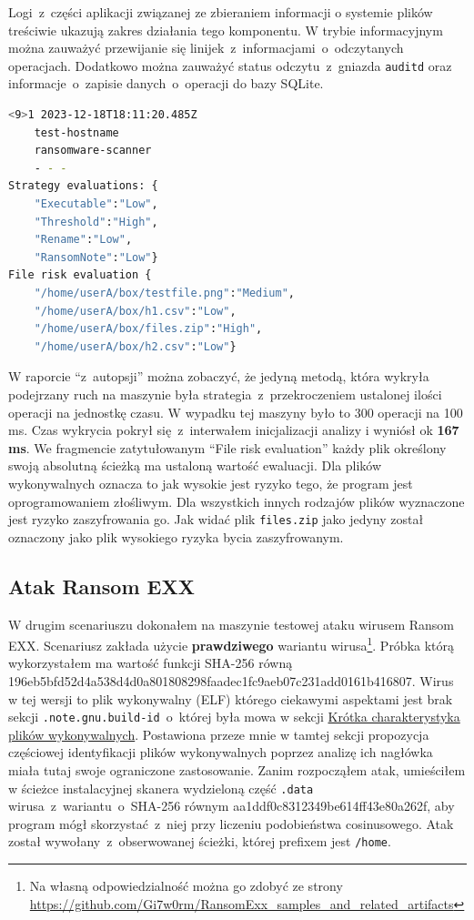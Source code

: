 Logi~z~części aplikacji związanej ze zbieraniem informacji o systemie plików treściwie ukazują zakres działania tego komponentu. W trybie informacyjnym można zauważyć przewijanie się linijek~z~informacjami~o~odczytanych operacjach. Dodatkowo można zauważyć status odczytu~z~gniazda \texttt{auditd} oraz informacje~o~zapisie danych~o~operacji do bazy SQLite.\newpage

\begin{lstlisting}[language=bash,
    backgroundcolor=\color{EEGold!5!white},
    caption={Raport wygenerowany ze skanera, który pozwoliłem sobie delikatnie sformatować aby widać było lepiej jego treść.},
    label={lst:raportau}]
    <9>1 2023-12-18T18:11:20.485Z
    test-hostname 
    ransomware-scanner 
    - - -  
Strategy evaluations: {
    "Executable":"Low",
    "Threshold":"High",
    "Rename":"Low",
    "RansomNote":"Low"}
File risk evaluation {
    "/home/userA/box/testfile.png":"Medium",
    "/home/userA/box/h1.csv":"Low",
    "/home/userA/box/files.zip":"High",
    "/home/userA/box/h2.csv":"Low"}
\end{lstlisting}
W raporcie \enquote{z~autopsji} można zobaczyć, że jedyną metodą, która wykryła podejrzany ruch na maszynie była strategia~z~przekroczeniem ustalonej ilości operacji na jednostkę czasu. W wypadku tej maszyny było to 300 operacji na 100 ms. 
Czas wykrycia pokrył się~z~interwałem inicjalizacji analizy i wyniósł ok \textbf{167 ms}.
\newline
We fragmencie zatytułowanym \foreignquote{english}{File risk evaluation} każdy plik określony swoją absolutną ścieżką ma ustaloną wartość ewaluacji. Dla plików wykonywalnych oznacza to jak wysokie jest ryzyko tego, że program jest oprogramowaniem złośliwym. Dla wszystkich innych rodzajów plików wyznaczone jest ryzyko zaszyfrowania go. Jak widać plik \texttt{files.zip} jako jedyny został oznaczony jako plik wysokiego ryzyka bycia zaszyfrowanym.

\subsection{Atak Ransom EXX}
W drugim scenariuszu dokonałem na maszynie testowej ataku wirusem Ransom EXX. Scenariusz zakłada użycie \textbf{prawdziwego} wariantu wirusa\footnote{Na własną odpowiedzialność można go zdobyć ze strony \url{https://github.com/Gi7w0rm/RansomExx_samples_and_related_artifacts}}. Próbka którą wykorzystałem ma wartość funkcji SHA-256 równą 196eb5bfd52d4a538d4d0a801808298faadec1fc9aeb07c231add0161b416807. Wirus w tej wersji to plik wykonywalny (ELF) którego ciekawymi aspektami jest brak sekcji \texttt{.note.gnu.build-id}~o~której była mowa w sekcji \hyperref[sec:elfini]{Krótka charakterystyka plików wykonywalnych}. Postawiona przeze mnie w tamtej sekcji propozycja częściowej identyfikacji plików wykonywalnych poprzez analizę ich nagłówka miała tutaj swoje ograniczone zastosowanie. Zanim rozpocząłem atak, umieściłem w ścieżce instalacyjnej skanera wydzieloną część \texttt{.data} wirusa~z~wariantu~o~SHA-256 równym aa1ddf0c8312349be614ff43e80a262f, aby program mógł skorzystać~z~niej przy liczeniu podobieństwa cosinusowego. Atak został wywołany~z~obserwowanej ścieżki, której prefixem jest \texttt{/home}.

